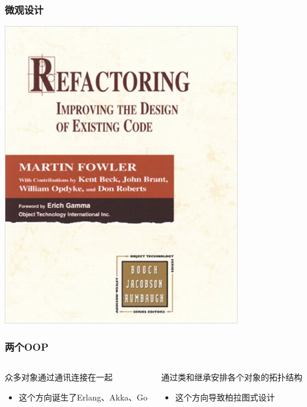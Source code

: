 \documentclass[UTF8,lualatex]{ctexbeamer}
\begin{document}
\begin{frame}
    \frametitle{微观设计}
    \begin{center}
        \includegraphics[height=0.7\textheight]{refactor.png}
    \end{center}
\end{frame}

\begin{frame}
    \frametitle{两个OOP}
    \begin{columns}[t]
        \begin{column}{0.45\textwidth}
            \begin{block}{众多对象通过通讯连接在一起}
                \begin{itemize}
                    \item 这个方向诞生了Erlang、Akka、Go
                \end{itemize}
            \end{block}
        \end{column}
        \begin{column}{0.45\textwidth}
            \begin{block}{通过类和继承安排各个对象的拓扑结构}
                \begin{itemize}
                    \item 这个方向导致柏拉图式设计
                \end{itemize}
            \end{block}
        \end{column}
    \end{columns}
\end{frame}
\end{document}

